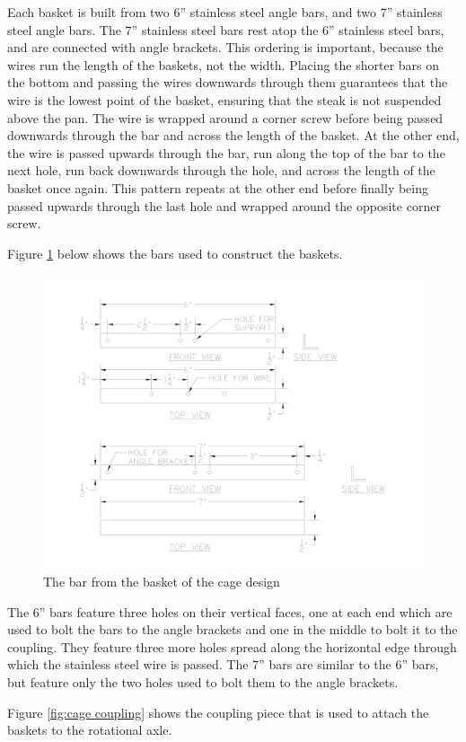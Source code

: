 \documentclass[11pt]{article}
\begin{document}
Each basket is built from two 6” stainless steel angle bars, and two 7” stainless steel angle bars.
The 7” stainless steel bars rest atop the 6” stainless steel bars, and are connected with angle brackets.
This ordering is important, because the wires run the length of the baskets, not the width.
Placing the shorter bars on the bottom and passing the wires downwards through them guarantees that the wire is the lowest point of the basket, ensuring that the steak is not suspended above the pan.
The wire is wrapped around a corner screw before being passed downwards through the bar and across the length of the basket.
At the other end, the wire is passed upwards through the bar, run along the top of the bar to the next hole, run back downwards through the hole, and across the length of the basket once again.
This pattern repeats at the other end before finally being passed upwards through the last hole and wrapped around the opposite corner screw.

Figure \ref{fig:cage bars} below shows the bars used to construct the baskets.

\begin{figure}[H]
  \centering
  \includegraphics[width=0.6\linewidth]{res/cage_bar.png}
  \caption{The bar from the basket of the cage design}
  \label{fig:cage bars}
\end{figure}

The 6” bars feature three holes on their vertical faces, one at each end which are used to bolt the bars to the angle brackets and one in the middle to bolt it to the coupling.
They feature three more holes spread along the horizontal edge through which the stainless steel wire is passed.
The 7” bars are similar to the 6” bars, but feature only the two holes used to bolt them to the angle brackets.

Figure \ref{fig:cage coupling} shows the coupling piece that is used to attach the baskets to the rotational axle.
\end{document}
